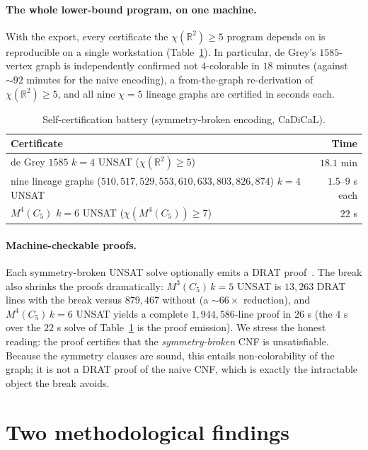 \documentclass[11pt]{article}
\theoremstyle{definition}
\newcommand{\R}{\mathbb{R}}
\newcommand{\chrom}{\chi}
\begin{document}
\paragraph{The whole lower-bound program, on one machine.} With the export, every
certificate the $\chrom(\R^2) \ge 5$ program depends on is reproducible on a
single workstation (Table~\ref{tab:battery}). In particular, de Grey's
$1585$-vertex graph is independently confirmed not $4$-colorable in $18$
minutes (against $\sim\!92$ minutes for the naive encoding), a from-the-graph
re-derivation of $\chrom(\R^2) \ge 5$, and all nine
$\chrom = 5$ lineage graphs are certified in seconds each.

\begin{table}[ht]
\centering
\caption{Self-certification battery (symmetry-broken encoding, CaDiCaL).}
\label{tab:battery}
\begin{tabular}{l r}
\toprule
Certificate & Time \\
\midrule
de Grey $1585$ $k{=}4$ UNSAT \quad ($\chrom(\R^2) \ge 5$) & $18.1$ min \\
nine lineage graphs ($510,517,529,553,610,633,803,826,874$) $k{=}4$ UNSAT &
  $1.5$--$9$ s each \\
$M^4(C_5)$ $k{=}6$ UNSAT \quad ($\chrom(M^4(C_5)) \ge 7$) & $22$ s \\
\bottomrule
\end{tabular}
\end{table}

\paragraph{Machine-checkable proofs.} Each symmetry-broken UNSAT solve optionally
emits a DRAT proof~\cite{WetzlerHeuleHunt2014}. The break also shrinks the proofs
dramatically: $M^3(C_5)\,k{=}5$ UNSAT is $13{,}263$ DRAT lines with the break
versus $879{,}467$ without (a $\sim\!66\times$ reduction), and $M^4(C_5)\,k{=}6$
UNSAT yields a complete $1{,}944{,}586$-line proof in $26$ s (the $4$ s over the
$22$ s solve of Table~\ref{tab:battery} is the proof emission). We stress the honest
reading: the proof certifies that the \emph{symmetry-broken} CNF is unsatisfiable.
Because the symmetry clauses are sound, this entails non-colorability of the
graph; it is not a DRAT proof of the naive CNF, which is exactly the intractable
object the break avoids.

\section{Two methodological findings}
\label{sec:methodology}
\end{document}
